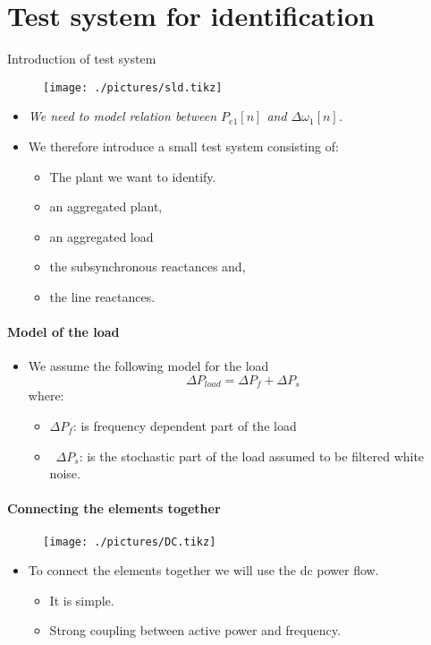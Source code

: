 \section{Test system for identification}
\begin{frame}{Introduction of test system}
		\begin{figure}[t]
		\texttt{[image: ./pictures/sld.tikz]}
	\end{figure}
	\begin{itemize}
			\item \emph{\color{red}We need to model relation between $P_{e1}[n]$ and $\Delta \omega_1[n]$.}
		\item We therefore introduce a small test system consisting of:
			\begin{itemize}
				\item The plant we want to identify.
				\item an aggregated plant,
				\item an aggregated load 
				\item the subsynchronous reactances and,
				\item the line reactances.
			\end{itemize}
		\end{itemize}
\end{frame}
\begin{frame}{\secname}
	\framesubtitle{Model of the load}
	\begin{itemize}
		\item We assume the following model for the load
			\begin{equation}
				\Delta P_{load} = \Delta P_f + \Delta P_s
			\end{equation}
		where:
		\begin{itemize}
			\item $\Delta P_f$: is frequency dependent part of the load
			\item $\Delta P_s$: is the stochastic part of the load assumed to be filtered white noise.
		\end{itemize}
	\end{itemize}
\end{frame}
\begin{frame}{\secname}
	\framesubtitle{Connecting the elements together}
	\begin{figure}[t]
		\texttt{[image: ./pictures/DC.tikz]}
	\end{figure}
	\begin{itemize}
		\item To connect the elements together we will use the dc power flow.
		\begin{itemize}
			\item It is simple.
			\item Strong coupling between active power and frequency.
		\end{itemize}
	\end{itemize}
\end{frame}
